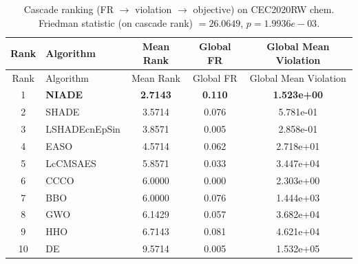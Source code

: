 \begin{center}
\small
\renewcommand{\arraystretch}{1.25}
\begin{longtable}{clccc}
\caption{Cascade ranking (FR $\to$ violation $\to$ objective) on CEC2020RW  chem. Friedman statistic (on cascade rank) $=26.0649$, $p=1.9936e-03$.}
\label{tab:cascade_ranking_CEC2020RW_chem} \\
\toprule
Rank & Algorithm & Mean Rank & Global FR & Global Mean Violation \\
\midrule
\endfirsthead
\toprule
Rank & Algorithm & Mean Rank & Global FR & Global Mean Violation \\
\midrule
\endhead
1 & \textbf{NIADE} & \textbf{2.7143} & \textbf{0.110} & \textbf{1.523e+00} \\
2 & SHADE & 3.5714 & 0.076 & 5.781e-01 \\
3 & LSHADEcnEpSin & 3.8571 & 0.005 & 2.858e-01 \\
4 & EASO & 4.5714 & 0.062 & 2.718e+01 \\
5 & LcCMSAES & 5.8571 & 0.033 & 3.447e+04 \\
6 & CCCO & 6.0000 & 0.000 & 2.303e+00 \\
7 & BBO & 6.0000 & 0.076 & 1.444e+03 \\
8 & GWO & 6.1429 & 0.057 & 3.682e+04 \\
9 & HHO & 6.7143 & 0.081 & 4.621e+04 \\
10 & DE & 9.5714 & 0.005 & 1.532e+05 \\
\bottomrule
\end{longtable}
\end{center}